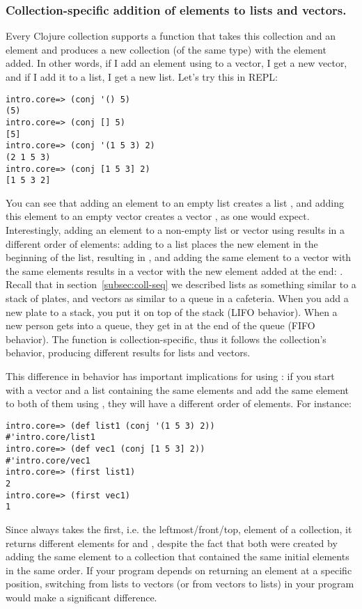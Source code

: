 \subsubsection{Collection-specific addition of elements to lists and vectors. }\label{subsubsec:conj}
Every Clojure collection supports a function  that takes this collection and an element and produces a new collection (of the same type) with the element added. In other words, if I add an element using   to a vector, I get a new vector, and if I add it to a list, I get a new list. Let's try this in REPL:
\begin{framed}
\begin{verbatim}
intro.core=> (conj '() 5)
(5)
intro.core=> (conj [] 5)
[5]
intro.core=> (conj '(1 5 3) 2)
(2 1 5 3)
intro.core=> (conj [1 5 3] 2)
[1 5 3 2]
\end{verbatim}
\end{framed}
You can see that adding an element  to an empty list creates a list , and adding this element to an empty vector creates a vector \clocode{[5]}, as one would expect. Interestingly, adding an element to a non-empty list or vector using  results in a different order of elements: adding  to a list  places the new element in the beginning of the list, resulting in , and adding the same element  to a vector with the same elements \clocode{[1 5 3]} results in a vector with the new element added at the end: \clocode{[1 5 3 2]}. Recall that in section~\ref{subsec:coll-seq} we described lists as something similar to a stack of plates, and vectors as similar to a queue in a cafeteria. When you add a new plate to a stack, you put it on top of the stack  (LIFO behavior). When a new person gets into a queue, they get in at the end of the queue (FIFO behavior). The function  is collection-specific, thus it follows the collection's behavior, producing different results for lists and vectors. 

This difference in behavior has important implications for using : if you start with a vector and a list containing the same elements and add the same element to both of them using , they will have a different order of elements. For instance: 
\begin{framed}
\begin{verbatim}
intro.core=> (def list1 (conj '(1 5 3) 2))
#'intro.core/list1
intro.core=> (def vec1 (conj [1 5 3] 2))
#'intro.core/vec1
intro.core=> (first list1)
2
intro.core=> (first vec1)
1
\end{verbatim}
\end{framed}
Since  always takes the first, i.e. the leftmost/front/top, element of a collection, it returns different elements for  and , despite the fact that both were created by adding the same element  to a collection that contained the same initial elements  in the same order. If your program depends on  returning an element at a specific position, switching from lists to vectors (or from vectors to lists) in your program would make a significant difference. 

